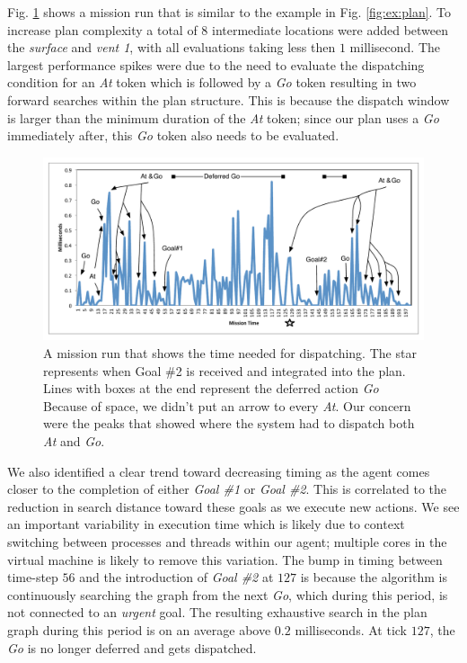 Fig. \ref{fig:example_run} shows a mission run that is similar to the
example in Fig. \ref{fig:ex:plan}.  To increase plan complexity a
total of $8$ intermediate locations were added between the {\em
  surface} and {\em vent 1}, with all evaluations taking less then $1$
millisecond. The largest performance spikes were due to the need to
evaluate the dispatching condition for an {\em At} token which is
followed by a {\em Go} token resulting in two forward searches within
the plan structure. This is because the dispatch window is larger than
the minimum duration of the {\em At} token; since our plan uses a {\em
  Go} immediately after, this \emph{Go} token also needs to be
evaluated.

\begin{figure}[t]
  \centering
  \vskip-3mm
  \includegraphics[width=1.2\columnwidth]{figs/example_run.pdf}
  \vskip-2mm
  \caption{\small A mission run that shows the time needed for
    dispatching. The star represents when Goal \#2 is received and
    integrated into the plan. Lines with boxes at the end represent
    the deferred action {\em Go} Because of space, we didn't put an
    arrow to every {\em At}. Our concern were the peaks that showed
    where the system had to dispatch both {\em At} and {\em Go}. }
  \label{fig:example_run}
  \vskip-2mm
\end{figure}


We also identified a clear trend toward decreasing timing as the agent
comes closer to the completion of either {\em Goal \#1} or {\em Goal
  \#2}. This is correlated to the reduction in search distance toward
these goals as we execute new actions.  We see an important
variability in execution time which is likely due to context switching
between processes and threads within our agent; multiple cores in the
virtual machine is likely to remove this variation.  The bump in
timing between time-step $56$ and the introduction of {\em Goal \#2}
at $127$ is because the algorithm is continuously searching the graph
from the next {\em Go}, which during this period, is not connected to
an {\em urgent} goal. The resulting exhaustive search in the plan
graph during this period is on an average above $0.2$ milliseconds. At
tick $127$, the {\em Go} is no longer deferred and gets dispatched.

